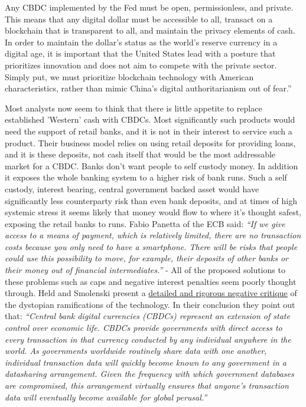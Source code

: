 \begin{itemize}
{Any CBDC implemented by the Fed must be open, permissionless, and private. This means that any digital dollar must be accessible to all, transact on a blockchain that is transparent to all, and maintain the privacy elements of cash.\\
In order to maintain the dollar’s status as the world’s reserve currency in a digital age, it is important that the United States lead with a posture that prioritizes innovation and does not aim to compete with the private sector.\\
Simply put, we must prioritize blockchain technology with American characteristics, rather than mimic China’s digital authoritarianism out of fear.''}\par
Most analysts now seem to think that there is little appetite to replace established 'Western' cash with CBDCs. Most significantly such products would need the support of retail banks, and it is not in their interest to service such a product. Their business model relies on using retail deposits for providing loans, and it is these deposits, not cash itself that would be the most addressable market for a CBDC. Banks don't want people to self custody money. In addition it exposes the whole banking system to a higher risk of bank runs. Such a self custody, interest bearing, central government backed asset would have significantly less counterparty risk than even bank deposits, and at times of high systemic stress it seems likely that money would flow to where it's thought safest, exposing the retail banks to runs. Fabio Panetta of the ECB said: \textit{``If we give access to a means of payment, which is relatively limited, there are no transaction costs because you only need to have a smartphone. There will be risks that people could use this possibility to move, for example, their deposits of other banks or their money out of financial intermediates.''} - All of the proposed solutions to these problems such as caps and negative interest penalties seem poorly thought through.
Held and Smolenski present a \href{https://www.btcpolicy.org/articles/why-the-u-s-should-reject-central-bank-digital-currencies}{detailed and rigorous negative critique} of the dystopian ramifications of the technology. In their conclusion they point out that: \textit{``Central bank digital currencies (CBDCs) represent an extension of state control over economic life. CBDCs provide governments with direct access to every transaction in that currency conducted by any individual anywhere in the world. As governments worldwide routinely share data with one another, individual transaction data will quickly become known to any government in a datasharing arrangement. Given the frequency with which government databases are compromised, this arrangement virtually ensures that anyone’s transaction data will eventually become available for global perusal.''}\par


\end{itemize}
